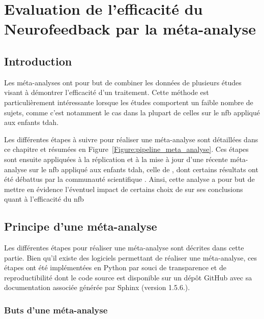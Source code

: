 \chapter{Evaluation de l'efficacité du Neurofeedback par la méta-analyse}

\section*{Introduction}
Les méta-analyses ont pour but de combiner les données de plusieurs études visant à démontrer l'efficacité d'un traitement. Cette méthode est
particulièrement intéressante lorsque les études comportent un faible nombre de sujets, comme c'est notamment le cas dans la plupart de celles sur 
le \gls{nfb} appliqué aux enfants \gls{tdah}.

Les différentes étapes à suivre pour réaliser une méta-analyse sont détaillées dans ce chapitre et résumées en Figure~\ref{Figure:pipeline_meta_analyse}.
Ces étapes sont ensuite appliquées à la réplication et à la mise à jour d'une récente méta-analyse sur le \gls{nfb} appliqué aux enfants \gls{tdah}, 
celle de \citet{Cortese2016}, dont certains résultats ont été débattus par la communauté scientifique \citep{Micoulaud2016}. Ainsi, cette analyse a pour but
de mettre en évidence l'éventuel impact de certains choix de \citet{Cortese2016} sur ses conclusions quant à l'efficacité du \gls{nfb}
\clearpage

\section{Principe d'une méta-analyse} \label{methods}

Les différentes étapes pour réaliser une méta-analyse sont décrites dans cette partie. Bien qu'il existe des logiciels permettant de réaliser une
méta-analyse, ces étapes ont été implémentées en Python par souci de transparence et de reproductibilité dont le code source est disponible sur un 
dépôt GitHub \citep{Bussalb2019c} avec sa documentation associée générée par Sphinx (version 1.5.6.).

\subsection{Buts d'une méta-analyse}

